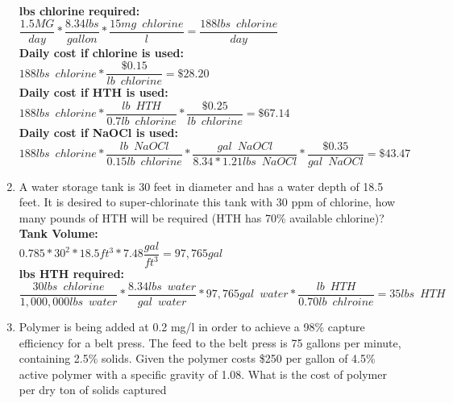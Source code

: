 \documentclass{article}
\begin{document}
\begin{enumerate}
\textbf{lbs chlorine required:}\\
$\dfrac{1.5 MG}{day}*\dfrac{8.34lbs}{gallon}*\dfrac{15mg \enspace chlorine}{l}=\dfrac{188 lbs \enspace chlorine}{day}$\\
\vspace{0.25cm}
\textbf{Daily cost if chlorine is used:}\\
$188lbs \enspace chlorine*\dfrac{\$0.15}{lb \enspace chlorine}=\boxed{\$28.20}$\\
\vspace{0.25cm}
\textbf{Daily cost if HTH is used:}\\
$188lbs \enspace chlorine*\dfrac{lb \enspace HTH}{0.7lb \enspace chlorine}*\dfrac{\$0.25}{lb \enspace chlorine}=\boxed{\$67.14}$\\
\vspace{0.25cm}
\textbf{Daily cost if NaOCl is used:}\\
$188lbs \enspace chlorine*\dfrac{lb \enspace NaOCl}{0.15lb \enspace chlorine}*\dfrac{gal \enspace NaOCl}{8.34*1.21 lbs\enspace NaOCl}*\dfrac{\$0.35}{gal \enspace NaOCl}=\boxed{\$43.47}$
\vspace{0.25cm}
\item A water storage tank is 30 feet in diameter and has a water depth of 18.5 feet. It is desired to super-chlorinate this tank with 30 ppm of chlorine, how many pounds of HTH will be required (HTH has 70\% available chlorine)?\\    
\vspace{0.25cm}
\textbf{Tank Volume:}\\
\vspace{0.25cm}
$0.785*30^2*18.5ft^3*7.48\dfrac{gal}{ft^3}=97,765 gal$\\
\vspace{0.25cm}
\textbf{lbs HTH required:}\\
\vspace{0.25cm}
$\dfrac{30lbs \enspace chlorine}{1,000,000lbs  \enspace water}*\dfrac{8.34lbs \enspace water}{gal \enspace water}*97,765 gal \enspace water *\dfrac{lb \enspace HTH}{0.70lb \enspace chlroine}=\boxed{35 lbs \enspace HTH}$
\vspace{0.25cm}
\item Polymer is being added at 0.2 mg/l in order to achieve a 98\% capture efficiency for a belt press.  The feed to the belt press is 75 gallons per minute, containing 2.5\% solids.  Given the polymer costs \$250 per gallon of 4.5\% active polymer with a specific gravity of 1.08.  What is the cost of polymer per dry ton of solids captured  \\


\end{enumerate}
\end{document}
